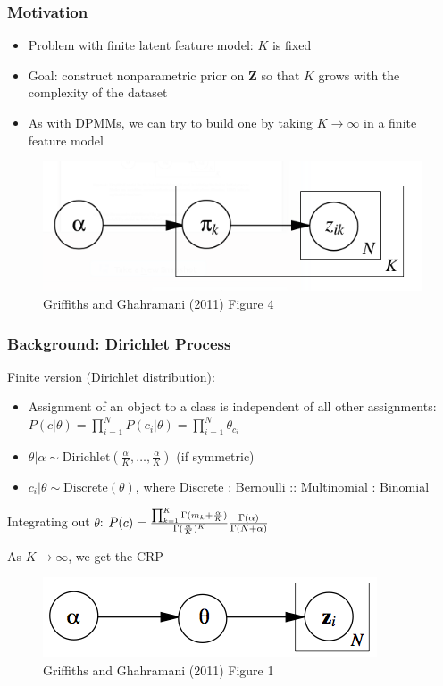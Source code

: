 \documentclass[13pt]{beamer}
\begin{document}
\begin{frame}
\frametitle{Motivation}
\begin{itemize}
\item Problem with finite latent feature model: $K$ is fixed
\item Goal: construct nonparametric prior on $\mathbf{Z}$ so that $K$ grows with the complexity of the dataset
\item As with DPMMs, we can try to build one by taking $K \rightarrow \infty$ in a finite feature model
\end{itemize}

\begin{figure}
\begin{center}
\includegraphics[scale=0.4]{./img/beta-bernoulli.png}
\caption{Griffiths and Ghahramani (2011) Figure 4}
\end{center}
\end{figure}
\end{frame}
\begin{frame}
\frametitle{Background: Dirichlet Process}

Finite version (Dirichlet distribution):
\begin{itemize}
\item Assignment of an object to a class is independent of all other assignments: $P(c|\theta) = \prod_{i=1}^N P(c_i|\theta) = \prod_{i=1}^N \theta_{c_i}$
\item $\theta|\alpha \sim \text{Dirichlet}(\frac{\alpha}{K},\ldots,\frac{\alpha}{K})$ (if symmetric)
\item $c_i|\theta \sim \text{Discrete}(\theta)$, where Discrete : Bernoulli :: Multinomial : Binomial
\end{itemize}

Integrating out $\theta$: $P(c) = { \prod_{k=1}^K \Gamma(m_k + \frac{\alpha}{K}) \over \Gamma(\frac{\alpha}{K})^K} {\Gamma(\alpha) \over \Gamma(N+\alpha)}$

As $K \rightarrow \infty$, we get the CRP

\begin{figure}
\begin{center}
\includegraphics[scale=0.3]{./img/crp-graphical-model.png}
\caption{Griffiths and Ghahramani (2011) Figure 1}
\end{center}
\end{figure}

\end{frame}
\end{document}
